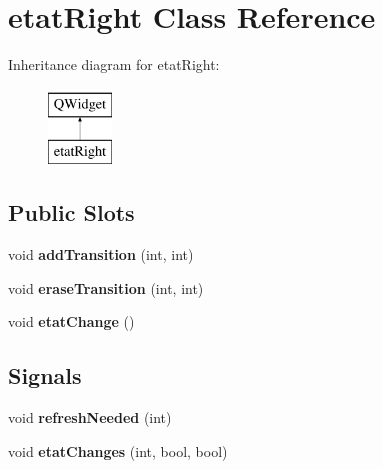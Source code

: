 \hypertarget{classetat_right}{\section{etat\-Right Class Reference}
\label{classetat_right}
}
Inheritance diagram for etat\-Right\-:\begin{figure}[H]
\begin{center}
\leavevmode
\includegraphics[height=2.000000cm]{classetat_right}
\end{center}
\end{figure}
\subsection*{Public Slots}
\begin{DoxyCompactItemize}
\item 
\hypertarget{classetat_right_a34b0092285d37cdcb418e65c9b0d7725}{void {\bfseries add\-Transition} (int, int)}\label{classetat_right_a34b0092285d37cdcb418e65c9b0d7725}

\item 
\hypertarget{classetat_right_aeb2508e316991470781711f57281963b}{void {\bfseries erase\-Transition} (int, int)}\label{classetat_right_aeb2508e316991470781711f57281963b}

\item 
\hypertarget{classetat_right_ac15456fc1dacf084b9bcbae7d6699627}{void {\bfseries etat\-Change} ()}\label{classetat_right_ac15456fc1dacf084b9bcbae7d6699627}

\end{DoxyCompactItemize}
\subsection*{Signals}
\begin{DoxyCompactItemize}
\item 
\hypertarget{classetat_right_ac7e6e4cff96fe796b6dcf1c4fca96e48}{void {\bfseries refresh\-Needed} (int)}\label{classetat_right_ac7e6e4cff96fe796b6dcf1c4fca96e48}

\item 
\hypertarget{classetat_right_a4ee395991e158ac64118b802d23b0962}{void {\bfseries etat\-Changes} (int, bool, bool)}\label{classetat_right_a4ee395991e158ac64118b802d23b0962}

\end{DoxyCompactItemize}
